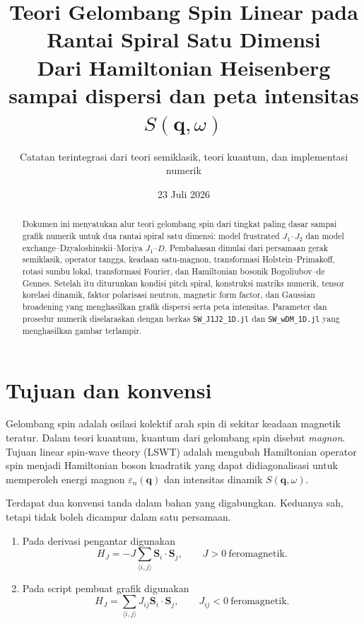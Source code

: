 \documentclass[11pt,a4paper]{article}
\title{\textbf{Teori Gelombang Spin Linear pada Rantai Spiral Satu Dimensi}\\[0.4em]
\large Dari Hamiltonian Heisenberg sampai dispersi dan peta intensitas $S(\bm q,\omega)$}
\author{Catatan terintegrasi dari teori semiklasik, teori kuantum, dan implementasi numerik}
\date{23 Juli 2026}
\newcommand{\vq}{\bm q}
\newcommand{\vS}{\bm S}
\begin{document}
\maketitle

\begin{abstract}
Dokumen ini menyatukan alur teori gelombang spin dari tingkat paling dasar sampai grafik numerik untuk dua rantai spiral satu dimensi: model frustrated $J_1$--$J_2$ dan model exchange--Dzyaloshinskii--Moriya $J_1$--$D$. Pembahasan dimulai dari persamaan gerak semiklasik, operator tangga, keadaan satu-magnon, transformasi Holstein--Primakoff, rotasi sumbu lokal, transformasi Fourier, dan Hamiltonian bosonik Bogoliubov--de Gennes. Setelah itu diturunkan kondisi pitch spiral, konstruksi matriks numerik, tensor korelasi dinamik, faktor polarisasi neutron, magnetic form factor, dan Gaussian broadening yang menghasilkan grafik dispersi serta peta intensitas. Parameter dan prosedur numerik diselaraskan dengan berkas \texttt{SW\_J1J2\_1D.jl} dan \texttt{SW\_wDM\_1D.jl} yang menghasilkan gambar terlampir.
\end{abstract}

\tableofcontents
\listoffigures
\clearpage

\section{Tujuan dan konvensi}

Gelombang spin adalah osilasi kolektif arah spin di sekitar keadaan magnetik teratur. Dalam teori kuantum, kuantum dari gelombang spin disebut \emph{magnon}. Tujuan linear spin-wave theory (LSWT) adalah mengubah Hamiltonian operator spin menjadi Hamiltonian boson kuadratik yang dapat didiagonalisasi untuk memperoleh energi magnon $\varepsilon_n(\vq)$ dan intensitas dinamik $S(\vq,\omega)$.

Terdapat dua konvensi tanda dalam bahan yang digabungkan. Keduanya sah, tetapi tidak boleh dicampur dalam satu persamaan.

\begin{enumerate}
  \item Pada derivasi pengantar digunakan
  \begin{equation}
  H_J=-J\sum_{\langle i,j\rangle}\vS_i\cdot\vS_j,
  \qquad J>0\ \text{feromagnetik}.
  \label{eq:minusJconvention}
  \end{equation}
  \item Pada script pembuat grafik digunakan
  \begin{equation}
  H_J=\sum_{\langle i,j\rangle}J_{ij}\vS_i\cdot\vS_j,
  \qquad J_{ij}<0\ \text{feromagnetik}.
  \label{eq:scriptconvention}
  \end{equation}
\end{enumerate}
\end{document}
